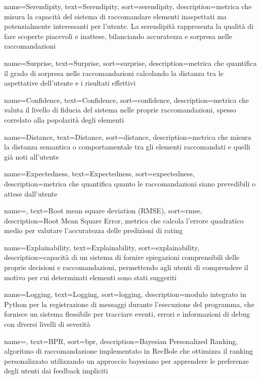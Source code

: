  {
    name=Serendipity,
    text=Serendipity,
    sort=serendipity,
    description={metrica che misura la capacità del sistema di raccomandare elementi inaspettati ma potenzialmente interessanti per l'utente. La serendipità rappresenta la qualità di fare scoperte piacevoli e inattese, bilanciando accuratezza e sorpresa nelle raccomandazioni}
}

 {
    name=Surprise,
    text=Surprise,
    sort=surprise,
    description={metrica che quantifica il grado di sorpresa nelle raccomandazioni calcolando la distanza tra le aspettative dell'utente e i risultati effettivi}
}

 {
    name=Confidence,
    text=Confidence,
    sort=confidence,
    description={metrica che valuta il livello di fiducia del sistema nelle proprie raccomandazioni, spesso correlato alla popolarità degli elementi}
}

 {
    name=Distance,
    text=Distance,
    sort=distance,
    description={metrica che misura la distanza semantica o comportamentale tra gli elementi raccomandati e quelli già noti all'utente}
}

 {
    name=Expectedness,
    text=Expectedness,
    sort=expectedness,
    description={metrica che quantifica quanto le raccomandazioni siano prevedibili o attese dall'utente}
}

 {
    name=,
    text=Root mean square deviation (RMSE),
    sort=rmse,
    description={Root Mean Square Error, metrica che calcola l'errore quadratico medio per valutare l'accuratezza delle predizioni di rating}
}

 {
    name=Explainability,
    text=Explainability,
    sort=explainability,
    description={capacità di un sistema di fornire spiegazioni comprensibili delle proprie decisioni e raccomandazioni, permettendo agli utenti di comprendere il motivo per cui determinati elementi sono stati suggeriti}
}

 {
    name=Logging,
    text=Logging,
    sort=logging,
    description={modulo integrato in Python per la registrazione di messaggi durante l'esecuzione del programma, che fornisce un sistema flessibile per tracciare eventi, errori e informazioni di debug con diversi livelli di severità}
}

 {
    name=,
    text=BPR,
    sort=bpr,
    description={Bayesian Personalized Ranking, algoritmo di raccomandazione implementato in RecBole che ottimizza il ranking personalizzato utilizzando un approccio bayesiano per apprendere le preferenze degli utenti dai feedback impliciti}
}

